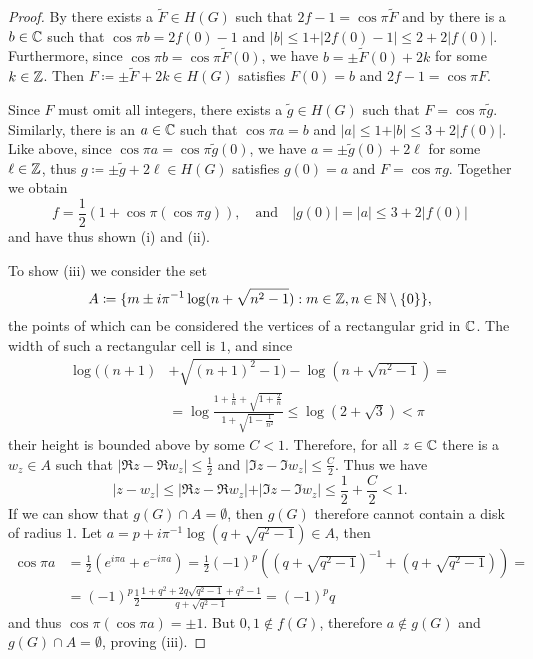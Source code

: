 \begin{proof}
    By  there exists a $\widetilde{F} \in H(G)$ such that $2f - 1 = \cos \pi \widetilde{F}$ and by  there is a $b \in \mathbb{C}$ such that $\cos \pi b = 2f(0) - 1$ and $\vert b \vert \leq 1 + \vert 2 f(0) - 1 \vert \leq 2 + 2 \vert f(0) \vert$. Furthermore, since $\cos \pi b = \cos \pi \widetilde{F}(0)$, we have $b = \pm \widetilde{F}(0) + 2k$ for some $k \in \mathbb{Z}$. Then $F \coloneqq \pm \widetilde{F} + 2k \in H(G)$ satisfies $F(0) = b$ and $2f - 1 = \cos \pi F$.
    
    Since $F$ must omit all integers, there exists a $\widetilde{g} \in H(G)$ such that $F = \cos \pi \widetilde{g}$. Similarly, there is an $a \in \mathbb{C}$ such that $\cos \pi a = b$ and $\vert a \vert \leq 1 + \vert b \vert \leq 3 + 2 \vert f(0) \vert$. Like above, since $\cos \pi a = \cos \pi \widetilde{g}(0)$, we have $a = \pm \widetilde{g}(0) + 2\ell$ for some $\ell \in \mathbb{Z}$, thus $g \coloneqq \pm \widetilde{g} + 2\ell \in H(G)$ satisfies $g(0) = a$ and $F = \cos \pi g$. Together we obtain
    $$ \textstyle f = \frac{1}{2} (1 + \cos \pi (\cos \pi g)), \quad \textrm{and} \quad \vert g(0) \vert = \vert a \vert \leq 3 + 2 \vert f(0) \vert $$
    and have thus shown (i) and (ii).

    To show (iii) we consider the set
    $$ A \coloneqq \{ m \pm i \pi^{-1} \log (n + \sqrt{n^2 - 1}) : m \in \mathbb{Z}, n \in \mathbb{N} \setminus \{ 0 \} \}, $$
    the points of which can be considered the vertices of a rectangular grid in $\mathbb{C}$. The width of such a rectangular cell is $1$, and since
    \begin{align*}
        \log ((n+1) &+ \sqrt{(n+1)^2 - 1}) - \log (n + \sqrt{n^2 - 1}) = \\
        &= \log \frac{1 + \frac{1}{n} + \sqrt{1 + \frac{2}{n}}}{1 + \sqrt{1 - \frac{1}{n^2}}} \leq \log (2 + \sqrt{3}) < \pi
    \end{align*}
    their height is bounded above by some $C < 1$. Therefore, for all $z \in \mathbb{C}$ there is a $w_z \in A$ such that $\vert \Re z - \Re w_z \vert \leq \frac{1}{2}$ and $\vert \Im z - \Im w_z \vert \leq \frac{C}{2}$. Thus we have
    $$ \vert z - w_z \vert \leq \vert \Re z - \Re w_z \vert + \vert \Im z - \Im w_z \vert \leq \frac{1}{2} + \frac{C}{2} < 1. $$
    If we can show that $g(G) \cap A = \emptyset$, then $g(G)$ therefore cannot contain a disk of radius $1$. Let $a = p + i \pi^{-1} \log(q + \sqrt{q^2 - 1}) \in A$, then
    \begin{align*}
        \cos \pi a &= {\textstyle\frac{1}{2}}( e^{i \pi a} + e^{-i \pi a}) = {\textstyle\frac{1}{2}} (-1)^p ((q + \sqrt{q^2 - 1})^{-1} + (q + \sqrt{q^2 - 1})) = \\
        &= (-1)^p \frac{1}{2} \frac{1 + q^2 + 2q \sqrt{q^2 - 1} + q^2 - 1}{q + \sqrt{q^2 - 1}} = (-1)^p q
    \end{align*}
    and thus $\cos \pi (\cos \pi a) = \pm 1$. But $0, 1 \notin f(G)$, therefore $a \notin g(G)$ and $g(G) \cap A = \emptyset$, proving (iii).


\end{proof}
